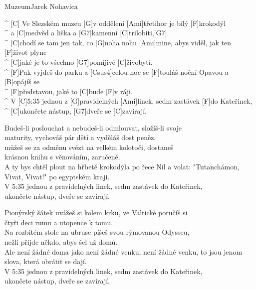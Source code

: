 \begin{song}{Muzeum}{Jarek Nohavica}

\begin{guitar}
^ [C] Ve Slezském muzeu [G]v oddělení  [Ami]třetihor je bílý [F]krokodýl\\
^ a [C]medvěd a liška a [G7]kamenní   [C]trilobiti,[G7]\\
^ [C]chodí se tam jen tak, co [G]noha nohu [Ami]mine, abys viděl, jak ten [F]život plyne\\
^ [C]jaké je to všechno [G7]pomíjivé   [C]živobytí.\\
^ [F]Pak vyjdeš do parku a [Csus4]celou noc se [F]touláš noční Opavou a [B]opájíš se\\
^ [F]představou, jaké to [C]bude [F]v ráji.\\
^ V [C]5:35 jednou z [G]pravidelných [Ami]linek, sedm zastávek [F]do Kateřinek,\\
^ [C]ukončete nástup, [G7]dveře se [C]zavírají.\\
\end{guitar}

\begin{guitar}
Budeš-li poslouchat a nebudeš-li odmlouvat, složíš-li svoje \\
maturity, vychováš pár dětí a vyděláš dost peněz,\\
můžeš se za odměnu svézt na velkém kolotoči, dostaneš \\
krásnou knihu s věnováním, zaručeně.\\
A ty bys chtěl plout na hřbetě krokodýla po řece Nil a volat: "Tutanchámon, \\
Vivat, Vivat!" po egyptském kraji.\\
V 5:35 jednou z pravidelných linek, sedm zastávek do Kateřinek,\\
ukončete nástup, dveře se zavírají.\\
\end{guitar}

\begin{guitar}
Pionýrský šátek uvážeš si kolem krku, ve Valtické poručíš si \\
čtyři deci rumu a utopence k tomu.\\
Na rozbitém stole na ubruse píšeš svou rýmovanou Odysseu,\\
nežli přijde někdo, abys šel už domů.\\
Ale není žádné doma jako není žádné venku, není žádné venku, to jsou jenom \\
slova, která obrátit se dají.\\
V 5:35 jednou z pravidelných linek, sedm zastávek do Kateřinek,\\
ukončete nástup, dveře se zavírají.\\
\end{guitar}


\end{song}
